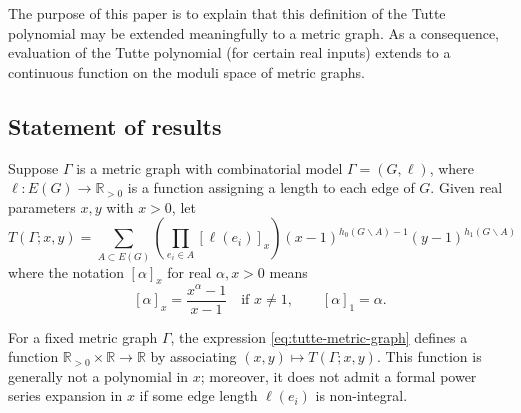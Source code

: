 \documentclass{amsart}
\theoremstyle{definition}
\newcommand{\RR}{\mathbb{R}}
\begin{document}
The purpose of this paper is to explain that this definition of the Tutte polynomial may be extended meaningfully to a metric graph.
As a consequence, evaluation of the Tutte polynomial (for certain real inputs) extends to a continuous function on the moduli space of metric graphs.

\subsection{Statement of results}
Suppose $\Gamma$ is a metric graph with combinatorial model $\Gamma = (G,\ell)$,
where $\ell : E(G) \to \RR_{>0}$ is a function assigning a 
length to each edge of $G$.
Given real parameters $x,y$ with $x > 0$,
let 
\begin{equation}
\label{eq:tutte-metric-graph}
T(\Gamma; x,y) = \sum_{A \subset E(G)} \left( \prod_{e_i \in A} [\ell(e_i)]_{x} \right)
(x-1)^{h_0(G\backslash A) - 1}(y-1)^{h_1(G\backslash A)}
\end{equation}
where the notation $[\alpha]_x$ for real $\alpha, x > 0$ means
\begin{equation*}
\label{eq:q-analog-real}
[\alpha]_x = \frac{x^\alpha - 1}{x-1}
\quad\text{if } x \neq 1,
\qquad 
[\alpha]_1 = \alpha.
\end{equation*}


For a fixed metric graph $\Gamma$,
the expression \eqref{eq:tutte-metric-graph} defines a function
$\RR_{>0}\times \RR \to \RR$
by associating $(x,y) \mapsto T(\Gamma; x,y)$. 
This function is generally not a polynomial in $x$; %
moreover,  it does not admit a formal power series expansion in $x$ 
if some edge length $\ell(e_i)$ is non-integral.
\end{document}
